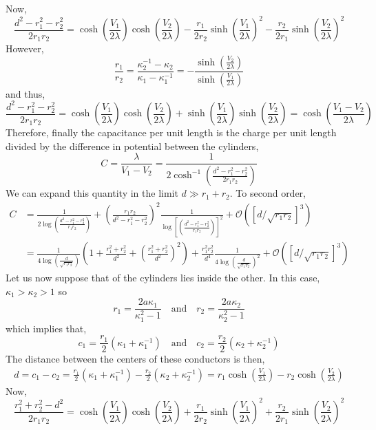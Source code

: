 \documentclass[12pt]{extarticle}
\theoremstyle{definition}
\begin{document}
Now,
\[ \frac{d^2 - r_1^2 - r_2^2}{2 r_1 r_2} = \cosh{\left( \frac{V_1}{2 \lambda} \right)} \cosh{\left( \frac{V_2}{2 \lambda} \right)} - \frac{r_1}{2 r_2} \sinh{\left( \frac{V_1}{2 \lambda} \right)}^2 - \frac{r_2}{2 r_1} \sinh{\left( \frac{V_2}{2 \lambda} \right)}^2  \]
However,
\[ \frac{r_1}{r_2} = \frac{\kappa_2^{-1} - \kappa_2}{\kappa_1 - \kappa_1^{-1}} = - \frac{\sinh{\left( \frac{V_2}{2 \lambda} \right)}}{\sinh{\left( \frac{V_1}{2 \lambda} \right)}} \]
and thus,
\[ \frac{d^2 - r_1^2 - r_2^2}{2 r_1 r_2} =  \cosh{\left( \frac{V_1}{2 \lambda} \right)} \cosh{\left( \frac{V_2}{2 \lambda} \right)} + \sinh{\left( \frac{V_1}{2 \lambda} \right)} \sinh{\left( \frac{V_2}{2 \lambda} \right)} = \cosh{ \left( \frac{V_1 - V_2}{2 \lambda} \right) }\]
Therefore, finally the capacitance per unit length is the charge per unit length divided by the difference in potential between the cylinders,
\[ C = \frac{\lambda}{V_1 - V_2} = \frac{1}{2 \cosh^{-1}{\left( \frac{d^2 - r_1^2 - r_2^2}{2 r_1 r_2} \right)}}\]
We can expand this quantity in the limit $d \gg r_1 + r_2$. To second order,
\begin{align*}
C & = \frac{1}{2 \log{\left( \frac{d^2 - r_1^2 - r_2^2}{r_1 r_2} \right) }}  + \left( \frac{r_1 r_2}{d^2 - r_1^2 - r_2^2} \right)^2 \frac{1}{\log{ \left[ \left( \frac{d^2 - r_1^2 - r_2^2}{r_1 r_2} \right) \right]^2 }} + \mathcal{O}\left( [d /\sqrt{r_1 r_2}]^3 \right)
\\
& = \frac{1}{4 \log{\left( \frac{d}{\sqrt{r_1 r_2}} \right)}} \left( 1 + \frac{r_1^2 + r_2^2}{d^2} + \left( \frac{r_1^2 + r_2^2}{d^2} \right)^2 \right) + \frac{r_1^2 r_2^2}{d^4} \frac{1}{4 \log{\left( \frac{d}{\sqrt{r_1 r_2}} \right)}^2} + \mathcal{O}\left( [d /\sqrt{r_1 r_2}]^3 \right)
\end{align*}  
Let us now suppose that of the cylinders lies inside the other. In this case, $\kappa_1 > \kappa_2 > 1$ so
\[ r_1 = \frac{2 a \kappa_1}{\kappa_1^2 - 1} \quad \text{and} \quad r_2 = \frac{2 a \kappa_2}{\kappa_2^2 - 1} \]
which implies that,
\[ c_1 = \frac{r_1}{2} \left( \kappa_1 + \kappa_1^{-1} \right)  \quad \text{and} \quad c_2 = \frac{r_2}{2} \left( \kappa_2 + \kappa_2^{-1} \right)  \]
The distance between the centers of these conductors is then,
\begin{align*}
d = c_1 - c_2 = \frac{r_1}{2} \left( \kappa_1 + \kappa_1^{-1} \right) - \frac{r_2}{2} \left( \kappa_2 + \kappa_2^{-1} \right) = r_1 \cosh{\left( \frac{V_1}{2 \lambda} \right)} - r_2 \cosh{\left( \frac{V_2}{2 \lambda} \right)}  
\end{align*} 
Now,
\[ \frac{r_1^2 + r_2^2 - d^2}{2 r_1 r_2} = \cosh{\left( \frac{V_1}{2 \lambda} \right)} \cosh{\left( \frac{V_2}{2 \lambda} \right)} + \frac{r_1}{2 r_2} \sinh{\left( \frac{V_1}{2 \lambda} \right)}^2 + \frac{r_2}{2 r_1} \sinh{\left( \frac{V_2}{2 \lambda} \right)}^2  \]
\end{document}
